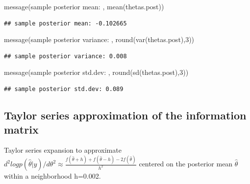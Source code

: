 \documentclass[
]{book}
\newenvironment{Shaded}{\begin{snugshade}}{\end{snugshade}}
\newcommand{\DecValTok}[1]{\textcolor[rgb]{0.00,0.00,0.81}{#1}}
\newcommand{\FunctionTok}[1]{\textcolor[rgb]{0.00,0.00,0.00}{#1}}
\newcommand{\NormalTok}[1]{#1}
\newcommand{\StringTok}[1]{\textcolor[rgb]{0.31,0.60,0.02}{#1}}
\theoremstyle{definition}
\theoremstyle{definition}
\theoremstyle{definition}
\theoremstyle{definition}
\theoremstyle{remark}
\begin{document}
\begin{Shaded}
\begin{Highlighting}[]
 \FunctionTok{message}\NormalTok{(}\StringTok{\textquotesingle{}sample posterior mean: \textquotesingle{}}\NormalTok{, }\FunctionTok{mean}\NormalTok{(thetas.post))}
\end{Highlighting}
\end{Shaded}

\begin{verbatim}
## sample posterior mean: -0.102665
\end{verbatim}

\begin{Shaded}
\begin{Highlighting}[]
 \FunctionTok{message}\NormalTok{(}\StringTok{\textquotesingle{}sample posterior variance: \textquotesingle{}}\NormalTok{, }\FunctionTok{round}\NormalTok{(}\FunctionTok{var}\NormalTok{(thetas.post),}\DecValTok{3}\NormalTok{))}
\end{Highlighting}
\end{Shaded}

\begin{verbatim}
## sample posterior variance: 0.008
\end{verbatim}

\begin{Shaded}
\begin{Highlighting}[]
 \FunctionTok{message}\NormalTok{(}\StringTok{\textquotesingle{}sample posterior std.dev: \textquotesingle{}}\NormalTok{, }\FunctionTok{round}\NormalTok{(}\FunctionTok{sd}\NormalTok{(thetas.post),}\DecValTok{3}\NormalTok{))}
\end{Highlighting}
\end{Shaded}

\begin{verbatim}
## sample posterior std.dev: 0.089
\end{verbatim}

\hypertarget{taylor-series-approximation-of-the-information-matrix}{%
\subsection{Taylor series approximation of the information matrix}\label{taylor-series-approximation-of-the-information-matrix}}

Taylor series expansion to approximate \(d^2log p(\hat{\theta}|y)/d\theta^2 \approx \frac{f(\hat{\theta}+h)+f(\hat{\theta}-h)-2f(\hat{\theta})}{h^2}\) centered on the posterior mean \(\hat{\theta}\) within a neighborhood h=0.002.
\end{document}
